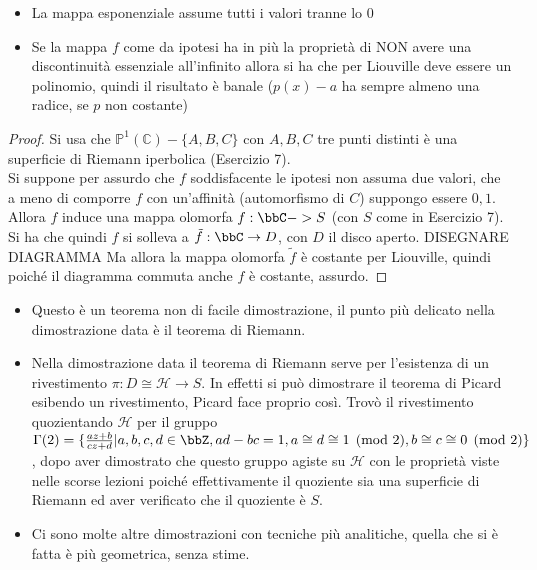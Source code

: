 \begin{osservazione}
\begin{itemize}
\item La mappa esponenziale assume tutti i valori tranne lo $0$
\item Se la mappa $f$ come da ipotesi ha in più la proprietà di NON avere una discontinuità essenziale all'infinito allora si ha che per Liouville deve essere un polinomio, quindi il risultato è banale ($p(x)-a$ ha sempre almeno una radice, se $p$ non costante)
\end{itemize}
\end{osservazione}


\begin{proof}
Si usa che $\mathbb{P}^1(\mathbb{C})\minus\{ A, B, C\}$ con $A, B, C$ tre punti distinti è una superficie di Riemann iperbolica (Esercizio 7).\\
Si suppone per assurdo che $f$ soddisfacente le ipotesi non assuma due valori, che a meno di comporre $f$ con un'affinità (automorfismo di $C$) suppongo essere $0,1$.
Allora $f$ induce una mappa olomorfa $f:\bbC->S$ (con $S$ come in Esercizio 7).
Si ha che quindi $f$ si solleva a $\tilde{f}:\bbC\rightarrow D$, con $D$ il disco aperto. DISEGNARE DIAGRAMMA
Ma allora la mappa olomorfa $\tilde{f}$ è costante per Liouville, quindi poiché il diagramma commuta anche $f$ è costante, assurdo.
\end{proof}

\begin{osservazione}
\begin{itemize}
\item Questo è un teorema non di facile dimostrazione, il punto più delicato nella dimostrazione data è il teorema di Riemann.
\item Nella dimostrazione data il teorema di Riemann serve per l'esistenza di un rivestimento $\pi:D\cong \mathcal{H} \rightarrow S$. In effetti si può dimostrare il teorema di Picard esibendo un rivestimento, Picard face proprio così. Trovò il rivestimento quozientando $\mathcal{H}$ per il gruppo $\Gamma(2)=\{ \frac{az+b}{cz+d} | a,b,c,d\in \bbZ, ad-bc=1, a\cong d \cong 1 \pmod{2}, b\cong c \cong 0 \pmod{2} \}$, dopo aver dimostrato che questo gruppo agiste su $\mathcal{H}$ con le proprietà viste nelle scorse lezioni poiché effettivamente il quoziente sia una superficie di Riemann ed aver verificato che il quoziente è $S$.
\item Ci sono molte altre dimostrazioni con tecniche più analitiche, quella che si è fatta è più geometrica, senza stime. 
\end{itemize}
\end{osservazione}

